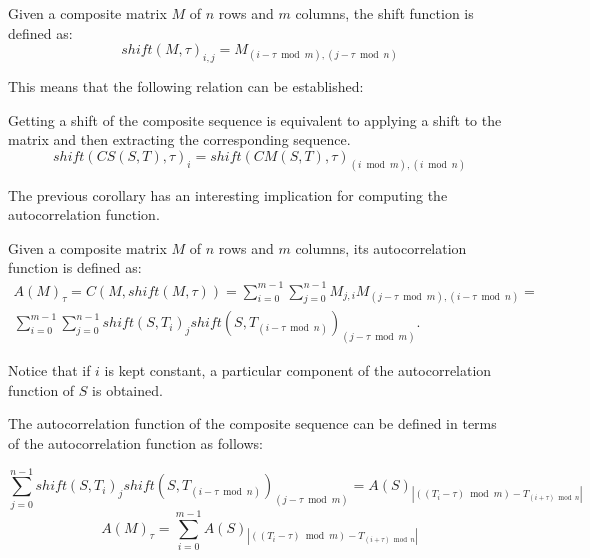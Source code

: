 \begin{definition}\label{definition:composition:shift}
  Given a composite matrix $M$ of $n$ rows and $m$ columns, the shift function
  is defined as:
  \begin{equation}
    shift(M, \tau)_{i, j} = M_{(i-\tau \bmod m), (j-\tau \bmod n)}
  \end{equation}
\end{definition}
This means that the following relation can be established:
  \begin{corollary} Getting a shift of the composite sequence is equivalent to
  applying a shift to the matrix and then extracting the corresponding
  sequence.
    \begin{equation}
      shift(CS(S, T), \tau)_{i} = shift(CM(S, T), \tau)_{(i \bmod m), (i \bmod n)}
    \end{equation}
  \end{corollary}

The previous corollary has an interesting implication for computing the autocorrelation function.

\begin{corollary}
  Given a composite matrix $M$ of $n$ rows and $m$ columns, its
  autocorrelation function is defined as:
  \begin{equation}
    \begin{split}
      A(M)_{\tau} = C(M, shift(M, \tau)) = \sum_{i=0}^{m-1}\sum_{j=0}^{n-1}M_{j, i}M_{(j-\tau \bmod m),(i - \tau \bmod n)} = \\
      \sum_{i=0}^{m-1}\sum_{j=0}^{n-1}shift(S, T_{i})_{j}shift(S, T_{(i - \tau \bmod n)})_{(j-\tau \bmod m)}.
    \end{split}
  \end{equation}
\end{corollary}

Notice that if $i$ is kept constant, a particular component of the
autocorrelation function of $S$ is obtained.

\begin{property} \label{composition:prop:1}
The autocorrelation function of the composite
sequence can be defined in terms of the autocorrelation function as follows:

\begin{equation}
  \sum_{j=0}^{n-1}shift(S, T_{i})_{j}shift(S, T_{(i - \tau \bmod n)})_{(j-\tau \bmod m)} = A(S)_{|((T_{i} - \tau) \bmod m) - T_{(i + \tau) \bmod n}|}
\end{equation}
\begin{equation}
  A(M)_{\tau} = \sum_{i=0}^{m-1} A(S)_{|((T_{i} - \tau) \bmod m) - T_{(i + \tau) \bmod n}|}
\end{equation}

\end{property}

